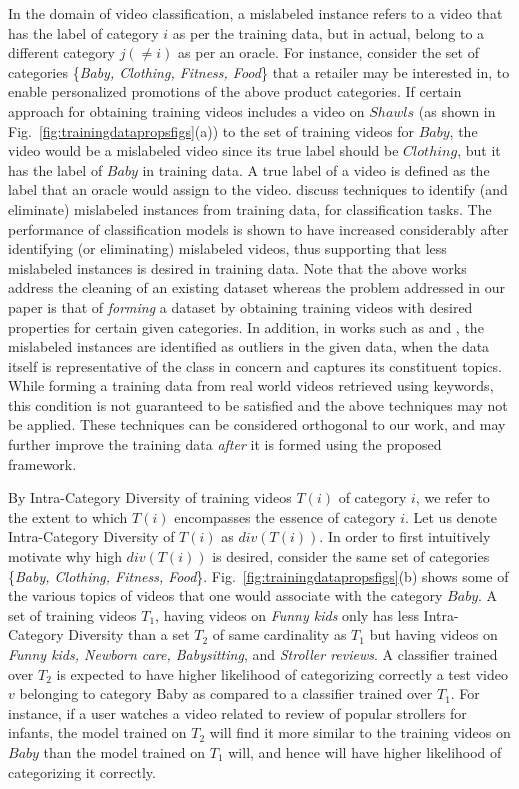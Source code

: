 In the domain of video classification, a mislabeled instance refers to a video that has the label of category $i$ as per the training data, but in actual, belong to a different category $j ( \neq i)$ as per an oracle. For instance, consider the set of categories \{\textit{Baby, Clothing, Fitness, Food}\} that a retailer may be interested in, to enable personalized promotions of the above product categories. If certain approach for obtaining training videos includes a video on $Shawls$ (as shown in Fig.~\ref{fig:trainingdatapropsfigs}(a)) to the set of training videos for $Baby$, the video would be a mislabeled video since its true label should be $Clothing$, but it has the label of $Baby$ in training data. A true label of a video is defined as the label that an oracle would assign to the video. \cite{brodley1996identifying,zhu2003eliminating} discuss techniques to identify (and eliminate) mislabeled instances from training data, for classification tasks. The performance of classification models is shown to have increased considerably after identifying (or eliminating) mislabeled videos, thus supporting that less mislabeled instances is desired in training data.  Note that the above works address the cleaning of an existing dataset whereas the problem addressed in our paper is that of \textit{forming} a dataset by obtaining training videos with desired properties for certain given categories. In addition, in works such as \cite{brodley1996identifying} and \cite{zhu2003eliminating}, the mislabeled instances are identified as outliers in the given data, when the data itself is representative of the class in concern and captures its constituent topics. While forming a training data from real world videos retrieved using keywords, this condition is not guaranteed to be satisfied and the above techniques may not be applied. These techniques can be considered orthogonal to our work, and may further improve the training data \textit{after} it is formed using the proposed framework. 

By Intra-Category Diversity of training videos $T(i)$ of category $i$, we refer to the extent to which $T(i)$ encompasses the essence of category $i$. Let us denote Intra-Category Diversity of $T(i)$ as $div(T(i))$. In order to first intuitively motivate why high $div(T(i))$ is desired, consider the same set of categories \{\textit{Baby, Clothing, Fitness, Food}\}. Fig.~\ref{fig:trainingdatapropsfigs}(b) shows some of the various topics of videos that one would associate with the category $Baby$. A set of training videos $T_1$, having videos on \textit{Funny kids} only has less Intra-Category Diversity than a set $T_2$ of same cardinality as $T_1$ but having videos on \textit{Funny kids, Newborn care, Babysitting}, and \textit{Stroller reviews}. A classifier trained over $T_2$ is expected to have higher likelihood of categorizing correctly a test video $v$ belonging to category Baby as compared to a classifier trained over $T_1$. For instance, if a user watches a video related to review of popular strollers for infants, the model trained on $T_2$ will find it more similar to the training videos on $Baby$ than the model trained on $T_1$ will, and hence will have higher likelihood of categorizing it correctly. 

